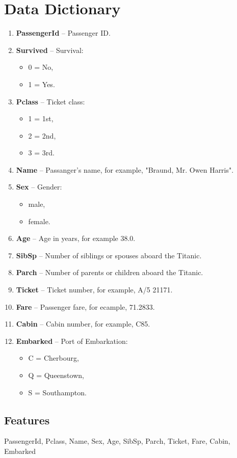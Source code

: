 \section{Data Dictionary}
\begin{enumerate}
	\item \textbf{PassengerId} -- Passenger ID.
	\item \textbf{Survived} -- Survival:
	\begin{itemize}
	    \item 0 = No, 
	    \item 1 = Yes.
	\end{itemize}
	\item \textbf{Pclass} -- Ticket class:
	\begin{itemize}	
	    \item 1 = 1st, 
	    \item 2 = 2nd, 
	    \item 3 = 3rd.
    \end{itemize}
	\item \textbf{Name} -- Passanger's name, for example, "Braund, 
	Mr. Owen Harris".
	\item \textbf{Sex} -- Gender:
	\begin{itemize}
	    \item male,
	    \item female.
	\end{itemize}
	\item \textbf{Age} -- Age in years, for example 38.0.
	\item \textbf{SibSp} -- Number of siblings or spouses aboard the Titanic.
	\item \textbf{Parch} -- Number of parents or children aboard the Titanic.
	\item \textbf{Ticket} -- Ticket number, for example, A/5 21171.
	\item \textbf{Fare} -- Passenger fare, for ecample, 71.2833.
	\item \textbf{Cabin} -- Cabin number, for example, C85.
	\item \textbf{Embarked} -- Port of Embarkation:
	\begin{itemize}
	    \item C = Cherbourg,
	    \item Q = Queenstown,
	    \item S = Southampton.
	\end{itemize}
\end{enumerate}


\subsection{Features}
PassengerId, Pclass, Name, Sex, Age, SibSp, Parch, Ticket, Fare, Cabin, 
\\Embarked


